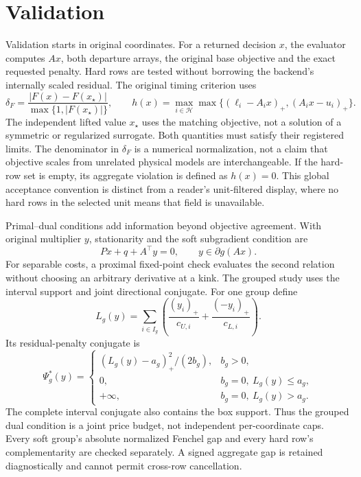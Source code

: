 \section{Validation}\label{sec:validation}
Validation starts in original coordinates. For a returned decision $x$, the
evaluator computes $Ax$, both departure arrays, the original base objective
and the exact requested penalty. Hard rows are tested without borrowing
the backend's internally scaled residual. The original timing criterion uses
\begin{equation}\label{eq:objective-discrepancy}
 \delta_F=\frac{|F(x)-F(x_\star)|}{\max\{1,|F(x_\star)|\}},\qquad
 h(x)=\max_{i\in\mathcal H}\max\{(\ell_i-A_ix)_+,(A_ix-u_i)_+\}.
\end{equation}
The independent lifted value $x_\star$ uses the matching objective, not a
solution of a symmetric or regularized surrogate. Both quantities must
satisfy their registered limits. The denominator in $\delta_F$ is a numerical
normalization, not a claim that objective scales from unrelated physical
models are interchangeable.
If the hard-row set is empty, its aggregate violation is defined as $h(x)=0$.
This global acceptance convention is distinct from a reader's unit-filtered
display, where no hard rows in the selected unit means that field is unavailable.

Primal--dual conditions add information beyond objective agreement. With
original multiplier $y$, stationarity and the soft subgradient condition are
\begin{equation}\label{eq:stationarity}
 Px+q+A^\top y=0,\qquad y\in\partial g(Ax).
\end{equation}
For separable costs, a proximal fixed-point check evaluates the second relation
without choosing an arbitrary derivative at a kink. The grouped study uses
the interval support and joint directional conjugate. For one group define
\begin{equation}\label{eq:group-dual-size}
 L_g(y)=\sum_{i\in I_g}\left(\frac{(y_i)_+}{c_{U,i}}+
                                  \frac{(-y_i)_+}{c_{L,i}}\right).
\end{equation}
Its residual-penalty conjugate is
\begin{equation}\label{eq:group-conjugate}
 \Psi_g^*(y)=\begin{cases}
 (L_g(y)-a_g)_+^2/(2b_g),&b_g>0,\\
 0,&b_g=0,\ L_g(y)\leq a_g,\\
 +\infty,&b_g=0,\ L_g(y)>a_g.
 \end{cases}
\end{equation}
The complete interval conjugate also contains the box support. Thus the
grouped dual condition is a joint price budget, not independent per-coordinate
caps. Every soft group's absolute normalized Fenchel gap and every hard
row's complementarity are checked separately. A signed aggregate gap is
retained diagnostically and cannot permit cross-row cancellation.

